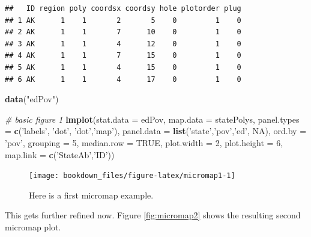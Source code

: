 \documentclass[
]{krantz}
\makeatletter
\newenvironment{Shaded}{\begin{snugshade}}{\end{snugshade}}
\newcommand{\CommentTok}[1]{\textcolor[rgb]{0.37,0.37,0.37}{\textit{#1}}}
\newcommand{\DataTypeTok}[1]{\textcolor[rgb]{0.27,0.27,0.27}{#1}}
\newcommand{\DecValTok}[1]{\textcolor[rgb]{0.06,0.06,0.06}{#1}}
\newcommand{\KeywordTok}[1]{\textcolor[rgb]{0.27,0.27,0.27}{\textbf{#1}}}
\newcommand{\NormalTok}[1]{#1}
\newcommand{\OtherTok}[1]{\textcolor[rgb]{0.37,0.37,0.37}{#1}}
\newcommand{\StringTok}[1]{\textcolor[rgb]{0.5,0.5,0.5}{#1}}
\newenvironment{kframe}{%
\medskip{}
\setlength{\fboxsep}{.8em}
 \def\at@end@of@kframe{}%
 \ifinner\ifhmode%
  \def\at@end@of@kframe{\end{minipage}}%
  \begin{minipage}{\columnwidth}%
 \fi\fi%
 \def\FrameCommand##1{\hskip\@totalleftmargin \hskip-\fboxsep
 \colorbox{shadecolor}{##1}\hskip-\fboxsep
     \hskip-\linewidth \hskip-\@totalleftmargin \hskip\columnwidth}%
 \MakeFramed {\advance\hsize-\width
   \@totalleftmargin\z@ \linewidth\hsize
   \@setminipage}}%
 {\par\unskip\endMakeFramed%
 \at@end@of@kframe}
\renewenvironment{Shaded}{\begin{kframe}}{\end{kframe}}
\makeatother
\begin{document}
\begin{verbatim}
##   ID region poly coordsx coordsy hole plotorder plug
## 1 AK      1    1       2       5    0         1    0
## 2 AK      1    1       7      10    0         1    0
## 3 AK      1    1       4      12    0         1    0
## 4 AK      1    1       7      15    0         1    0
## 5 AK      1    1       4      15    0         1    0
## 6 AK      1    1       4      17    0         1    0
\end{verbatim}

\begin{Shaded}
\begin{Highlighting}[]
\KeywordTok{data}\NormalTok{(}\StringTok{"edPov"}\NormalTok{)}

\CommentTok{# basic figure 1}
\KeywordTok{lmplot}\NormalTok{(}\DataTypeTok{stat.data =}\NormalTok{ edPov,}
    \DataTypeTok{map.data =}\NormalTok{ statePolys,}
    \DataTypeTok{panel.types =} \KeywordTok{c}\NormalTok{(}\StringTok{'labels'}\NormalTok{, }\StringTok{'dot'}\NormalTok{, }\StringTok{'dot'}\NormalTok{,}\StringTok{'map'}\NormalTok{),}
    \DataTypeTok{panel.data =} \KeywordTok{list}\NormalTok{(}\StringTok{'state'}\NormalTok{,}\StringTok{'pov'}\NormalTok{,}\StringTok{'ed'}\NormalTok{, }\OtherTok{NA}\NormalTok{),}
    \DataTypeTok{ord.by =} \StringTok{'pov'}\NormalTok{,   }
    \DataTypeTok{grouping =} \DecValTok{5}\NormalTok{, }\DataTypeTok{median.row =} \OtherTok{TRUE}\NormalTok{,}
    \DataTypeTok{plot.width =} \DecValTok{2}\NormalTok{, }\DataTypeTok{plot.height =} \DecValTok{6}\NormalTok{,}
    \DataTypeTok{map.link =} \KeywordTok{c}\NormalTok{(}\StringTok{'StateAb'}\NormalTok{,}\StringTok{'ID'}\NormalTok{))}
\end{Highlighting}
\end{Shaded}

\begin{figure}
\texttt{[image: bookdown\_files/figure-latex/micromap1-1]} \caption{Here is a first micromap example.}\label{fig:micromap1}
\end{figure}

This gets further refined now. Figure \ref{fig:micromap2} shows the resulting second micromap plot.
\end{document}
